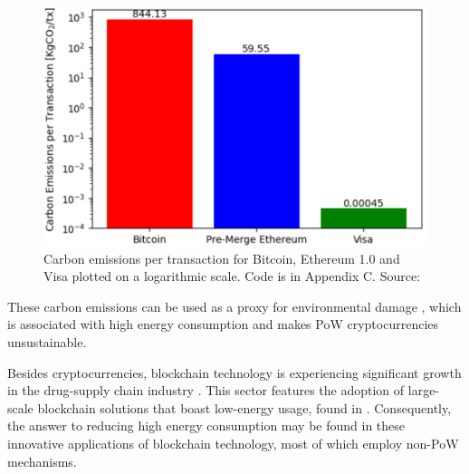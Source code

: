 \begin{figure}[!htb]
    \centering
    \includegraphics[width=13cm,center]{Figures/CarbonEmissionsPlot.png}
    \caption{Carbon emissions per transaction for Bitcoin, Ethereum 1.0 and Visa plotted on a logarithmic scale. Code is in Appendix C. Source: \cite{Kohli2023AnSolutions} }
    \label{Figure:CarbonEmissionsPlot}
\end{figure}

These carbon emissions can be used as a proxy for environmental damage \cite{2022VisaReport}, which is associated with high energy consumption and makes PoW cryptocurrencies unsustainable.

Besides cryptocurrencies, blockchain technology is experiencing significant growth in the drug-supply chain industry \cite{Labaran2021TheNigeria}. This sector features the adoption of large-scale blockchain solutions that boast low-energy usage, found in . Consequently, the answer to reducing high energy consumption may be found in these innovative applications of blockchain technology, most of which employ non-PoW mechanisms.

